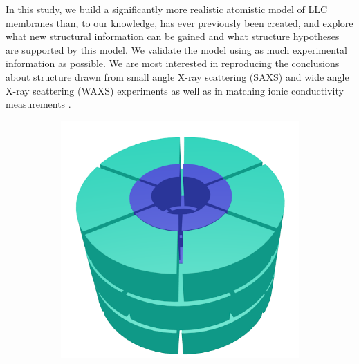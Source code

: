 \documentclass[journal=jpcbfk,manusciprt=article]{achemso}
\begin{document}
  In this study, we build a significantly more realistic atomistic model of LLC
  membranes than, to our knowledge, has ever previously been created, and explore
  what new structural information can be gained and what structure hypotheses are
  supported by this model. We validate the model using as much experimental
  information as possible. We are most interested in reproducing the conclusions
  about structure drawn from small angle X-ray scattering (SAXS)
  and wide angle X-ray scattering (WAXS) experiments as well as in matching ionic
  conductivity measurements \cite{feng_thin_2016}.

  \begin{figure}[!htb]
  \centering
	\begin{subfigure}{0.45\linewidth}
		\centering
		\includegraphics[width=\textwidth]{cartoon_pore.png}
		\caption{}~\label{fig:undetailed_pore}
	\end{subfigure}
	\begin{subfigure}{0.45\linewidth}
		\centering

\end{subfigure}
\end{figure}
\end{document}
